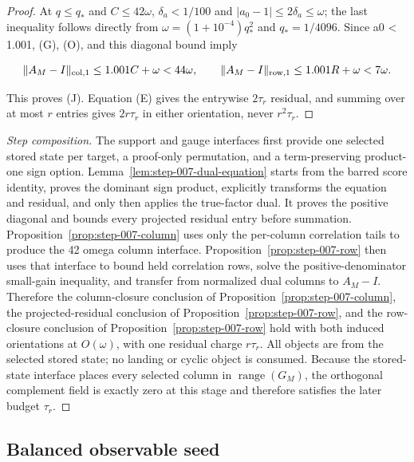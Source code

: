 \begin{proposition}
\begin{proof}
At $q\le q_*$ and $C\le42\omega$, $\delta_a<1/100$ and
$|a_0-1|\le2\delta_a\le\omega$; the last inequality follows directly from
$\omega=(1+10^{-4})q_*^2$ and $q_*=1/4096$.
Since a0 < 1.001, (G), (O), and this diagonal bound imply

\[
\|A_M-I\|_{\rm col,1}\le1.001C+\omega<44\omega,\qquad
\|A_M-I\|_{\rm row,1}\le1.001R+\omega<7\omega.
\]

This proves (J). Equation (E) gives the entrywise $2\tau_r$ residual, and
summing over at most $r$ entries gives $2r\tau_r$ in either orientation,
never $r^2\tau_r$.\quad\Box

\end{proof}
\end{proposition}
\begin{proof}[Step composition]
The support and gauge interfaces first provide one selected
stored state per target, a proof-only permutation, and a term-preserving
product-one sign option.  Lemma~\ref{lem:step-007-dual-equation} starts from the
barred score identity, proves the dominant sign product, explicitly
transforms the equation and residual, and only then applies the true-factor
dual.  It proves the positive diagonal and bounds every projected residual
entry before summation.  Proposition~\ref{prop:step-007-column} uses
only the per-column correlation tails to produce the 42 omega
column interface.  Proposition~\ref{prop:step-007-row} then uses that interface
to bound held correlation rows, solve the positive-denominator small-gain
inequality, and transfer from normalized dual columns to $A_M-I$. Therefore
the column-closure conclusion of Proposition~\ref{prop:step-007-column}, the projected-residual conclusion of Proposition~\ref{prop:step-007-row}, and the row-closure conclusion of Proposition~\ref{prop:step-007-row} hold with both induced orientations at
$O(\omega)$, with one residual charge $r\tau_r$. All objects are from the
selected stored state; no landing or cyclic object is consumed.
Because the stored-state interface places every selected column in
$\operatorname{range}(G_M)$, the orthogonal complement field is exactly zero
at this stage and therefore satisfies the later budget $\tau_r$.
\end{proof}

\subsection{Balanced observable seed}\label{app:step-008}

